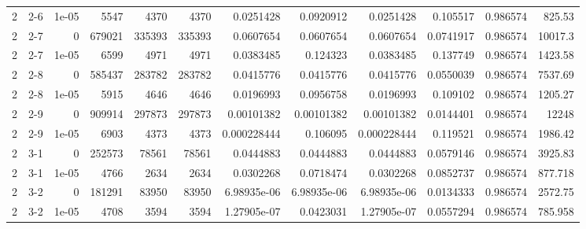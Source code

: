 \begin{tabular}{rlrrrrrrrrrr}
     2 & 2-6    &      1e-05 &        5547 &              4370 &              4370 &     0.0251428   &     0.0920912   &      0.0251428   &        0.105517  &               0.986574 &          825.53    \\
     2 & 2-7    &      0     &      679021 &            335393 &            335393 &     0.0607654   &     0.0607654   &      0.0607654   &        0.0741917 &               0.986574 &        10017.3     \\
     2 & 2-7    &      1e-05 &        6599 &              4971 &              4971 &     0.0383485   &     0.124323    &      0.0383485   &        0.137749  &               0.986574 &         1423.58    \\
     2 & 2-8    &      0     &      585437 &            283782 &            283782 &     0.0415776   &     0.0415776   &      0.0415776   &        0.0550039 &               0.986574 &         7537.69    \\
     2 & 2-8    &      1e-05 &        5915 &              4646 &              4646 &     0.0196993   &     0.0956758   &      0.0196993   &        0.109102  &               0.986574 &         1205.27    \\
     2 & 2-9    &      0     &      909914 &            297873 &            297873 &     0.00101382  &     0.00101382  &      0.00101382  &        0.0144401 &               0.986574 &        12248       \\
     2 & 2-9    &      1e-05 &        6903 &              4373 &              4373 &     0.000228444 &     0.106095    &      0.000228444 &        0.119521  &               0.986574 &         1986.42    \\
     2 & 3-1    &      0     &      252573 &             78561 &             78561 &     0.0444883   &     0.0444883   &      0.0444883   &        0.0579146 &               0.986574 &         3925.83    \\
     2 & 3-1    &      1e-05 &        4766 &              2634 &              2634 &     0.0302268   &     0.0718474   &      0.0302268   &        0.0852737 &               0.986574 &          877.718   \\
     2 & 3-2    &      0     &      181291 &             83950 &             83950 &     6.98935e-06 &     6.98935e-06 &      6.98935e-06 &        0.0134333 &               0.986574 &         2572.75    \\
     2 & 3-2    &      1e-05 &        4708 &              3594 &              3594 &     1.27905e-07 &     0.0423031   &      1.27905e-07 &        0.0557294 &               0.986574 &          785.958   \\

\end{tabular}
